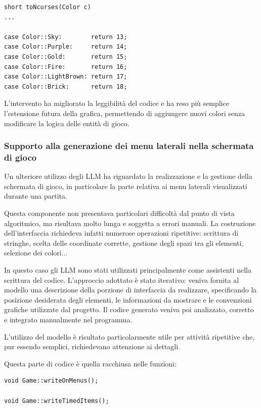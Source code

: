 \documentclass[a4paper,11pt]{article}
\begin{document}
\begin{verbatim}
short toNcurses(Color c)
...

case Color::Sky:        return 13;
case Color::Purple:     return 14;
case Color::Gold:       return 15;
case Color::Fire:       return 16;
case Color::LightBrown: return 17;
case Color::Brick:      return 18;
\end{verbatim}


L'intervento ha migliorato la leggibilità del codice e ha reso più semplice l'estensione futura della grafica, permettendo di aggiungere nuovi colori senza modificare la logica delle entità di gioco.

\subsubsection{Supporto alla generazione dei menu laterali nella schermata di gioco}

Un ulteriore utilizzo degli LLM ha riguardato la realizzazione e la gestione della schermata di gioco, in particolare la parte relativa ai menu laterali visualizzati durante una partita.

Questa componente non presentava particolari difficoltà dal punto di vista algoritmico, ma risultava molto lunga e soggetta a errori manuali. 
La costruzione dell'interfaccia richiedeva infatti numerose operazioni ripetitive: scrittura di stringhe, 
scelta delle coordinate corrette, gestione degli spazi tra gli elementi, selezione dei colori...

In questo caso gli LLM sono stati utilizzati principalmente come assistenti nella scrittura del codice. 
L'approccio adottato è stato iterativo: veniva fornita al modello una descrizione della porzione di interfaccia da realizzare, specificando la posizione desiderata degli elementi, le informazioni da mostrare e le convenzioni grafiche utilizzate dal progetto. 
Il codice generato veniva poi analizzato, corretto e integrato manualmente nel programma.

L'utilizzo del modello è risultato particolarmente utile per attività ripetitive che, pur essendo semplici, richiedevano attenzione ai dettagli. 

Questa parte di codice è quella racchiusa nelle funzioni:

\begin{verbatim}
void Game::writeOnMenus();

void Game::writeTimedItems();
\end{verbatim}
\end{document}

